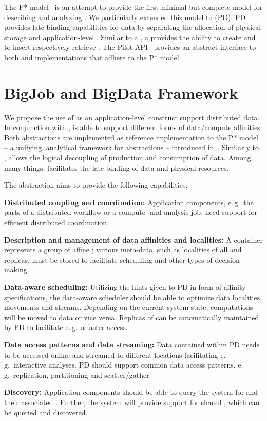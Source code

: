 \documentclass{sig-alternate}
\begin{document}
The P* model~\cite{pstar12} is an attempt to provide the first minimal
but complete model for describing and analyzing \pilotjobs. We
particularly extended this model to \pilotdata (PD): PD provides
late-binding capabilities for data by separating the allocation of
physical storage and application-level \dataunits.  Similar to a
\pilotcompute, a \pilotdata provides the ability to create \pilots and
to insert respectively retrieve \dataunits. The
Pilot-API~\cite{pilot_api} provides an abstract interface to both
\pilotcompute and \pilotdata implementations that adhere to the P*
model.

\section{BigJob and BigData Framework}

We propose the use of \pilotdata as an application-level construct support
distributed data. In conjunction with \pilotjob, \pilotdata is able to support
different forms of data/compute affinities. Both abstractions are implemented
as reference implementation to the P* model -- a unifying, analytical
framework for \pilot abstractions -- introduced in~\cite{pstar12}. 
Similarly to \pilotjobs, \pilotdata allows the logical decoupling
of production and consumption of data. Among many things, \pilotdata 
facilitates the late binding of data and physical resources.  

The \pilotdata abstraction aims to provide the following capabilities:
\begin{compactitem}
\item \textbf{Distributed coupling and coordination:} Application
  components, e.\,g.\ the parts of a distributed workflow or a
  compute- and analysis job, need support for efficient distributed
  coordination.
\item \textbf{Description and management of data affinities and
    localities:} A \pd container represents a group of affine
  \dataunits; %
  various meta-data, such as localities of all \dataunits and
  replicas, must be stored to facilitate scheduling and other types of
  decision making.
\item \textbf{Data-aware scheduling:} Utilizing the hints given to PD
  in form of affinity specifications, the data-aware scheduler should
  be able to optimize data localities, movements and
  streams. Depending on the current system state, computations will be
  moved to data or vice versa. Replicas of \dataunits can be
  automatically maintained by PD to facilitate e.\,g.\ a faster
  access.
\item \textbf{Data access patterns and data streaming:} Data contained
  within PD needs to be accessed online and streamed to different
  locations facilitating e.\,g.\ interactive analyses.  PD should
  support common data access patterns, e.\,g.\ replication,
  partitioning and scatter/gather.
\item \textbf{Discovery:} Application components should be able to
  query the system for \dataunits and their associated
  \pilots. Further, the system will provide support for shared \dus,
  which can be queried and discovered.
\end{compactitem}
\end{document}
